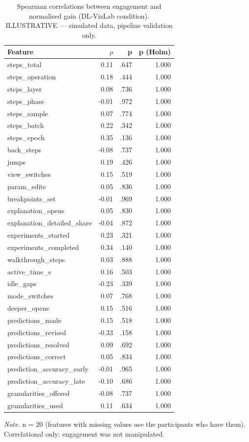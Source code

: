\begin{table}[htbp]
\centering
\small
\caption{Spearman correlations between engagement and normalised gain (DL-VizLab condition). ILLUSTRATIVE — simulated data, pipeline validation only.}
\label{tab:T14}
\begin{tabular}{lrrr}
\toprule
Feature & $\rho$ & p & p (Holm) \\
\midrule
steps\_total & 0.11 & .647 & 1.000 \\
steps\_operation & 0.18 & .444 & 1.000 \\
steps\_layer & 0.08 & .736 & 1.000 \\
steps\_phase & -0.01 & .972 & 1.000 \\
steps\_sample & 0.07 & .774 & 1.000 \\
steps\_batch & 0.22 & .342 & 1.000 \\
steps\_epoch & 0.35 & .136 & 1.000 \\
back\_steps & -0.08 & .737 & 1.000 \\
jumps & 0.19 & .426 & 1.000 \\
view\_switches & 0.15 & .519 & 1.000 \\
param\_edits & 0.05 & .836 & 1.000 \\
breakpoints\_set & -0.01 & .969 & 1.000 \\
explanation\_opens & 0.05 & .830 & 1.000 \\
explanation\_detailed\_share & -0.04 & .872 & 1.000 \\
experiments\_started & 0.23 & .321 & 1.000 \\
experiments\_completed & 0.34 & .140 & 1.000 \\
walkthrough\_steps & 0.03 & .888 & 1.000 \\
active\_time\_s & 0.16 & .503 & 1.000 \\
idle\_gaps & -0.23 & .339 & 1.000 \\
mode\_switches & 0.07 & .768 & 1.000 \\
deeper\_opens & 0.15 & .516 & 1.000 \\
predictions\_made & 0.15 & .518 & 1.000 \\
predictions\_revised & -0.33 & .158 & 1.000 \\
predictions\_resolved & 0.09 & .692 & 1.000 \\
predictions\_correct & 0.05 & .834 & 1.000 \\
prediction\_accuracy\_early & -0.01 & .965 & 1.000 \\
prediction\_accuracy\_late & -0.10 & .686 & 1.000 \\
granularities\_offered & -0.08 & .737 & 1.000 \\
granularities\_used & 0.11 & .634 & 1.000 \\
\bottomrule
\end{tabular}
\par\smallskip\footnotesize\textit{Note.} n = 20 (features with missing values use the participants who have them). Correlational only: engagement was not manipulated.
\end{table}
